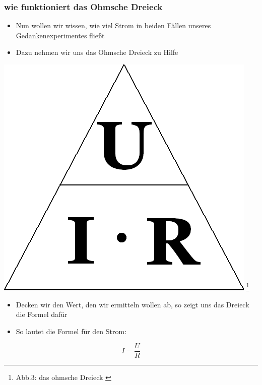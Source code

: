 \begin{frame}
	\frametitle{wie funktioniert das Ohmsche Dreieck}
	\begin{itemize}
		\item	Nun wollen wir wissen, wie viel Strom in beiden Fällen unseres Gedankenexperimentes fließt
		\item	Dazu nehmen wir uns das Ohmsche Dreieck zu Hilfe
	\end{itemize}
	\begin{center}
 		\includegraphics[scale=0.2]{e03/Ohm_law_triangle.png}
 		\footnote{Abb.3: das ohmsche Dreieck \cite{wmen}}
 	\end{center}
 	\begin{itemize}
 		\item	Decken wir den Wert, den wir ermitteln wollen ab, so zeigt uns das Dreieck die Formel dafür
 		\item	So lautet die Formel für den Strom:
 	\end{itemize}
 	\begin{equation}
 		I = \frac{U}{R}
 		\label{equ:Strom}
 	\end{equation}
\end{frame}

